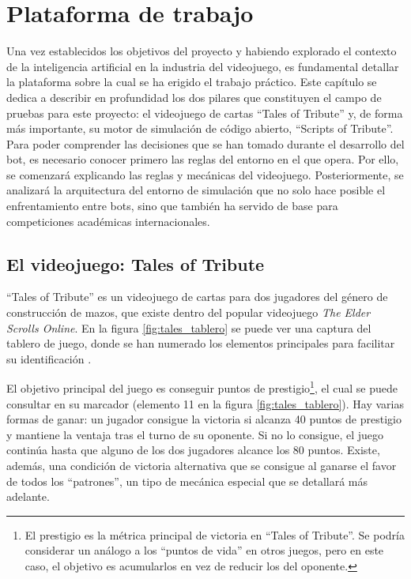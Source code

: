 \chapter{Plataforma de trabajo} \label{chap:plataforma_trabajo}

Una vez establecidos los objetivos del proyecto y habiendo explorado el contexto de la inteligencia artificial en la industria del videojuego, es fundamental detallar la plataforma sobre la cual se ha erigido el trabajo práctico. Este capítulo se dedica a describir en profundidad los dos pilares que constituyen el campo de pruebas para este proyecto: el videojuego de cartas ``Tales of Tribute'' y, de forma más importante, su motor de simulación de código abierto, ``Scripts of Tribute''. Para poder comprender las decisiones que se han tomado durante el desarrollo del bot, es necesario conocer primero las reglas del entorno en el que opera. Por ello, se comenzará explicando las reglas y mecánicas del videojuego. Posteriormente, se analizará la arquitectura del entorno de simulación que no solo hace posible el enfrentamiento entre bots, sino que también ha servido de base para competiciones académicas internacionales.


\section{El videojuego: Tales of Tribute} \label{sec:tales_of_tribute}

``Tales of Tribute'' es un videojuego de cartas para dos jugadores del género de construcción de mazos, que existe dentro del popular videojuego \textit{The Elder Scrolls Online}. En la figura \ref{fig:tales_tablero} se puede ver una captura del tablero de juego, donde se han numerado los elementos principales para facilitar su identificación \cite{pixel_eso_2022}.

El objetivo principal del juego es conseguir puntos de prestigio\footnote{El prestigio es la métrica principal de victoria en ``Tales of Tribute''. Se podría considerar un análogo a los ``puntos de vida'' en otros juegos, pero en este caso, el objetivo es acumularlos en vez de reducir los del oponente.}, el cual se puede consultar en su marcador (elemento 11 en la figura \ref{fig:tales_tablero}). Hay varias formas de ganar: un jugador consigue la victoria si alcanza 40 puntos de prestigio y mantiene la ventaja tras el turno de su oponente. Si no lo consigue, el juego continúa hasta que alguno de los dos jugadores alcance los 80 puntos. Existe, además, una condición de victoria alternativa que se consigue al ganarse el favor de todos los ``patrones'', un tipo de mecánica especial que se detallará más adelante.


